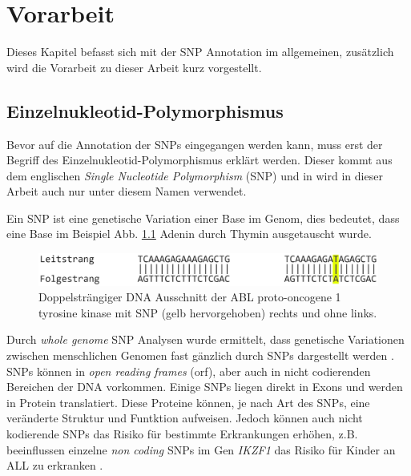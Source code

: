 \chapter{Vorarbeit}

Dieses Kapitel befasst sich mit der \ac{SNP} Annotation im allgemeinen, zusätzlich wird die Vorarbeit zu dieser Arbeit kurz vorgestellt.




\section{Einzelnukleotid-Polymorphismus}
Bevor auf die Annotation der \ac{SNP}s eingegangen werden kann, muss erst der Begriff des Einzelnukleotid-Polymorphismus erklärt werden. Dieser kommt aus dem englischen \emph{Single Nucleotide Polymorphism} (SNP) und in wird in dieser Arbeit auch nur unter diesem Namen verwendet.

Ein \ac{SNP} ist eine genetische Variation einer Base im Genom, dies bedeutet, dass eine Base im Beispiel Abb. \ref{fig:snp} Adenin durch Thymin ausgetauscht wurde.

\begin{figure}
\centering
\includegraphics[width=.95\textwidth]{images/DNA_ds_strand_with_snp.png}
\caption{Doppelsträngiger DNA Ausschnitt der ABL proto-oncogene 1 tyrosine kinase mit \ac{SNP} (gelb hervorgehoben) rechts und ohne links.}
\label{fig:snp}
\end{figure}



Durch \emph{whole genome} \ac{SNP} Analysen wurde ermittelt, dass genetische Variationen zwischen menschlichen Genomen fast gänzlich durch \ac{SNP}s dargestellt werden \cite{Do.2015}. 
\ac{SNP}s können in \emph{open reading frames} (orf), aber auch in nicht codierenden Bereichen der DNA vorkommen. Einige \ac{SNP}s liegen direkt in Exons und werden in Protein translatiert. Diese Proteine können, je nach Art des \ac{SNP}s, eine veränderte Struktur und Funtktion aufweisen. Jedoch können auch nicht kodierende \ac{SNP}s das Risiko für bestimmte Erkrankungen erhöhen, z.B. beeinflussen einzelne \emph{non coding} \ac{SNP}s im Gen \emph{IKZF1} das Risiko für Kinder an ALL zu erkranken \cite{Papaemmanuil.2009}.

